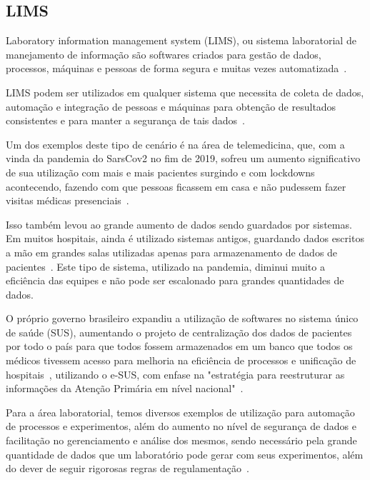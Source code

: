 \subsection{LIMS}


Laboratory information management system (LIMS), ou sistema laboratorial de manejamento de informação são softwares criados para gestão de dados, processos, máquinas e pessoas de forma segura e muitas vezes automatizada~\cite{Stafford1998LIMS:Technology}.


LIMS podem ser utilizados em qualquer sistema que necessita de coleta de dados, automação e integração de pessoas e máquinas para obtenção de resultados consistentes e para manter a segurança de tais dados~\cite{Sun2021LaboratoryEfficiency, TowardsXplore}.

Um dos exemplos deste tipo de cenário é na área de telemedicina, que, com a vinda da pandemia do SarsCov2 no fim de 2019, sofreu um aumento significativo de sua utilização com mais e mais pacientes surgindo e com lockdowns acontecendo, fazendo com que pessoas ficassem em casa e não pudessem fazer visitas médicas presenciais~\cite{kronenfeld2021, bakhtiar2020, GatesB.Colbert2020UtilityEra}.

Isso também levou ao grande aumento de dados sendo guardados por sistemas. Em muitos hospitais, ainda é utilizado sistemas antigos, guardando dados escritos a mão em grandes salas utilizadas apenas para armazenamento de dados de pacientes~\cite{2021TacklingMachine}. Este tipo de sistema, utilizado na pandemia, diminui muito a eficiência das equipes e não pode ser escalonado para grandes quantidades de dados.


O próprio governo brasileiro expandiu a utilização de softwares no sistema único de saúde (SUS), aumentando o projeto de centralização dos dados de pacientes por todo o país para que todos fossem armazenados em um banco que todos os médicos tivessem acesso para melhoria na eficiência de processos e unificação de hospitais~\cite{Araujo2021DesafiosCovid-19}, utilizando o e-SUS, com enfase na "estratégia para reestruturar as informações da Atenção Primária em nível nacional"~\cite{E-SUSAPS}.

Para a área laboratorial, temos diversos exemplos de utilização para automação de processos e experimentos, além do aumento no nível de segurança de dados e facilitação no gerenciamento e análise dos mesmos, sendo necessário pela grande quantidade de dados que um laboratório pode gerar com seus experimentos, além do dever de seguir rigorosas regras de regulamentação~\cite{Holzmuller-Laue2014ImprovedAutomation, Holzmuller-Laue2013Model-drivenLaboratories}.

